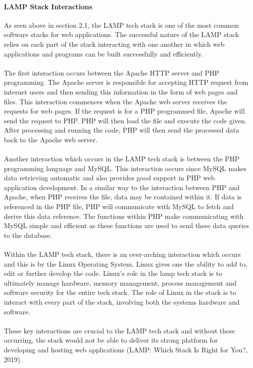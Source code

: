 \documentclass[a4paper, 11pt]{report}
\begin{document}
	\paragraph{LAMP Stack Interactions} As seen above in section 2.1, the LAMP tech stack is one of the most common software stacks for web applications. The successful nature of the LAMP stack relies on each part of the stack interacting with one another in which web applications and programs can be built successfully and efficiently. 
	\\
	\\
	\noindent
	The first interaction occurs between the Apache HTTP server and PHP programming. The Apache server is responsible for accepting HTTP request from internet users and then sending this information in the form of web pages and files. This interaction commences when the Apache web server receives the requests for web pages. If the request is for a PHP programmed file, Apache will send the request to PHP. PHP will then load the file and execute the code given. After processing and running the code, PHP will then send the processed data back to the Apache web server.
	\\
	\\
	\noindent
	Another interaction which occurs in the LAMP tech stack is between the PHP programming language and MySQL. This interaction occurs since MySQL makes data retrieving automatic and also provides good support in PHP web application development. In a similar way to the interaction between PHP and Apache, when PHP receives the file, data may be contained within it. If data is referenced in the PHP file, PHP will communicate with MySQL to fetch and derive this data reference. The functions within PHP make communicating with MySQL simple and efficient as these functions are used to send these data queries to the database.
	\\
	\\
	Within the LAMP tech stack, there is an over-arching interaction which occurs and this is by the Linux Operating System. Linux gives one the ability to add to, edit or further develop the code. Linux’s role in the lamp tech stack is to ultimately manage hardware, memory management, process management and software security for the entire tech stack. The role of Linux in the stack is to interact with every part of the stack, involving both the systems hardware and software.
	\\
	\\
	These key interactions are crucial to the LAMP tech stack and without these occurring, the stack would not be able to deliver its strong platform for developing and hosting web applications (LAMP: Which Stack Is Right for You?, 2019).
	
\end{document}
